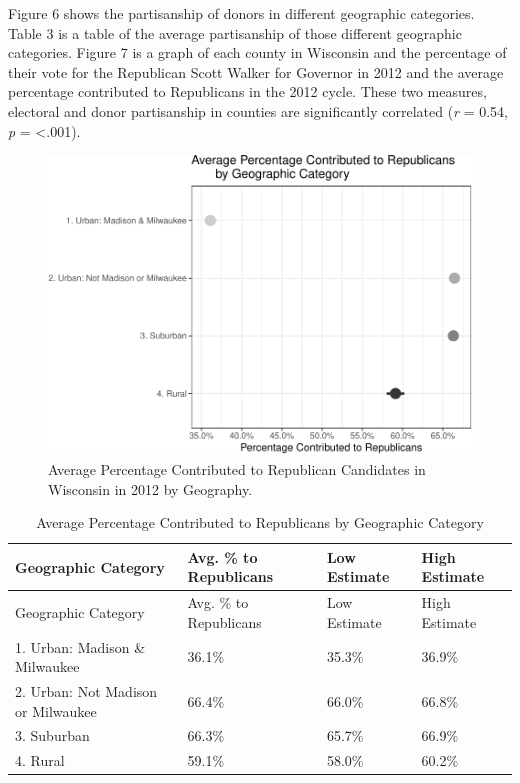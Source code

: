 \documentclass[12pt,]{article}
\begin{document}
Figure 6 shows the partisanship of donors in different geographic
categories. Table 3 is a table of the average partisanship of those
different geographic categories. Figure 7 is a graph of each county in
Wisconsin and the percentage of their vote for the Republican Scott
Walker for Governor in 2012 and the average percentage contributed to
Republicans in the 2012 cycle. These two measures, electoral and donor
partisanship in counties are significantly correlated (\emph{r} = 0.54,
\emph{p} = \textless.001).

\begin{figure}
\includegraphics[width=1\linewidth]{analysis_files/figure-latex/unnamed-chunk-20-1} \caption{Average Percentage Contributed to Republican Candidates in Wisconsin in 2012 by Geography.}\label{fig:unnamed-chunk-20}
\end{figure}

\begin{longtable}[]{@{}llll@{}}
\caption{Average Percentage Contributed to Republicans by Geographic
Category}\tabularnewline
\toprule
Geographic Category & Avg. \% to Republicans & Low Estimate & High
Estimate\tabularnewline
\midrule
\endfirsthead
\toprule
Geographic Category & Avg. \% to Republicans & Low Estimate & High
Estimate\tabularnewline
\midrule
\endhead
1. Urban: Madison \& Milwaukee & 36.1\% & 35.3\% & 36.9\%\tabularnewline
2. Urban: Not Madison or Milwaukee & 66.4\% & 66.0\% &
66.8\%\tabularnewline
3. Suburban & 66.3\% & 65.7\% & 66.9\%\tabularnewline
4. Rural & 59.1\% & 58.0\% & 60.2\%\tabularnewline
\bottomrule
\end{longtable}
\end{document}
